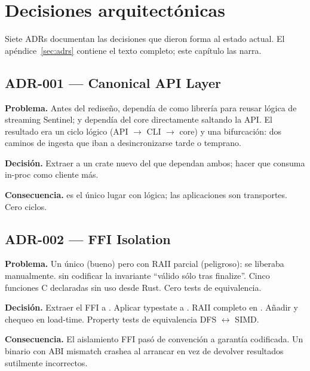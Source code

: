 \chapter{Decisiones arquitectónicas}
\label{sec:decisiones}

Siete ADRs documentan las decisiones que dieron forma al estado
actual. El apéndice~\ref{sec:adrs} contiene el texto completo; este
capítulo las narra.

\section{ADR-001 — Canonical API Layer}

\textbf{Problema.} Antes del rediseño, 
dependía de  como librería para reusar lógica de
streaming Sentinel; y  dependía del core
directamente saltando la API. El resultado era un ciclo lógico
(API $\to$ CLI $\to$ core) y una bifurcación: dos caminos de
ingesta que iban a desincronizarse tarde o temprano.

\textbf{Decisión.} Extraer  a un crate
nuevo  del que dependan ambos; hacer que
 consuma  in-proc como
cliente más.

\textbf{Consecuencia.}  es el único lugar
con lógica; las aplicaciones son transportes. Cero ciclos.

\section{ADR-002 — FFI Isolation}

\textbf{Problema.} Un único  (bueno) pero con
RAII parcial (peligroso):  se liberaba
manualmente.  sin codificar la
invariante ``válido sólo tras finalize''. Cinco funciones C
declaradas sin uso desde Rust. Cero tests de equivalencia.

\textbf{Decisión.} Extraer el FFI a .
Aplicar typestate a . RAII completo en
. Añadir  y chequeo en
load-time. Property tests de equivalencia DFS $\leftrightarrow$
SIMD.

\textbf{Consecuencia.} El aislamiento FFI pasó de convención a
garantía codificada. Un binario con ABI mismatch crashea al
arrancar en vez de devolver resultados sutilmente incorrectos.

